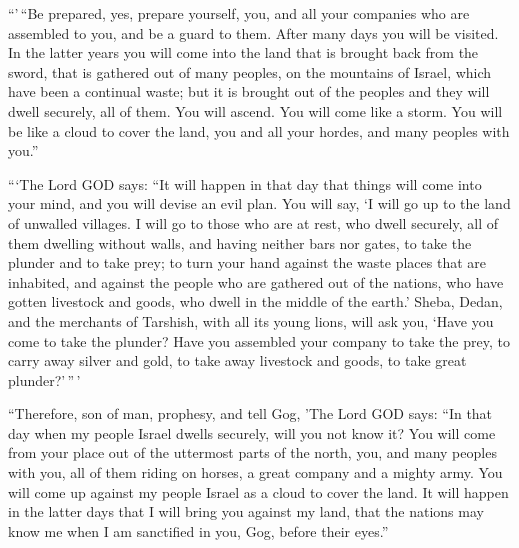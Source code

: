  ``'\,``Be prepared, yes, prepare yourself, you, and all
your companies who are assembled to you, and be a guard to them.
 After many days you will be visited. In the latter years
you will come into the land that is brought back from the sword, that is
gathered out of many peoples, on the mountains of Israel, which have
been a continual waste; but it is brought out of the peoples and they
will dwell securely, all of them.  You will ascend. You will
come like a storm. You will be like a cloud to cover the land, you and
all your hordes, and many peoples with you.''

 ```The Lord GOD says: ``It will happen in that day that
things will come into your mind, and you will devise an evil plan.
 You will say, `I will go up to the land of unwalled
villages. I will go to those who are at rest, who dwell securely, all of
them dwelling without walls, and having neither bars nor gates,
 to take the plunder and to take prey; to turn your hand
against the waste places that are inhabited, and against the people who
are gathered out of the nations, who have gotten livestock and goods,
who dwell in the middle of the earth.'  Sheba, Dedan, and
the merchants of Tarshish, with all its young lions, will ask you, `Have
you come to take the plunder? Have you assembled your company to take
the prey, to carry away silver and gold, to take away livestock and
goods, to take great plunder?'\,''\,'

 ``Therefore, son of man, prophesy, and tell Gog, 'The Lord
GOD says: ``In that day when my people Israel dwells securely, will you
not know it?  You will come from your place out of the
uttermost parts of the north, you, and many peoples with you, all of
them riding on horses, a great company and a mighty army. 
You will come up against my people Israel as a cloud to cover the land.
It will happen in the latter days that I will bring you against my land,
that the nations may know me when I am sanctified in you, Gog, before
their eyes.''

